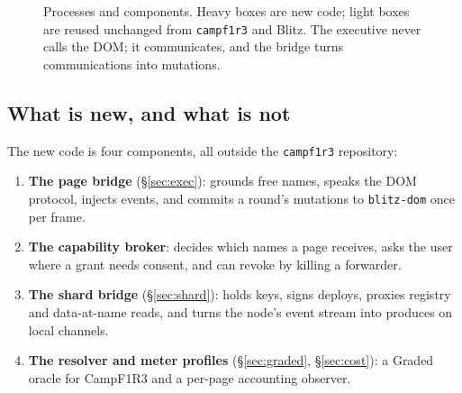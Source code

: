 \documentclass[11pt]{article}
\theoremstyle{definition}
\theoremstyle{remark}
\newcommand{\Camp}{CampF1R3}
\newcommand{\code}[1]{\texttt{#1}}
\begin{document}
\begin{figure}[!htb]
{}
\caption{Processes and components. Heavy boxes are new code; light boxes are reused
unchanged from \code{campf1r3} and Blitz. The executive never calls the DOM; it
communicates, and the bridge turns communications into mutations.}
\label{fig:arch}
\end{figure}

\subsection{What is new, and what is not}

The new code is four components, all outside the \code{campf1r3} repository:

\begin{enumerate}[nosep]
\item \textbf{The page bridge} (\S\ref{sec:exec}): grounds free names, speaks the
  DOM protocol, injects events, and commits a round's mutations to \code{blitz-dom}
  once per frame.
\item \textbf{The capability broker}: decides which names a page receives, asks the
  user where a grant needs consent, and can revoke by killing a forwarder.
\item \textbf{The shard bridge} (\S\ref{sec:shard}): holds keys, signs deploys,
  proxies registry and data-at-name reads, and turns the node's event stream into
  produces on local channels.
\item \textbf{The resolver and meter profiles} (\S\ref{sec:graded},
  \S\ref{sec:cost}): a Graded oracle for \Camp{} and a per-page accounting observer.
\end{enumerate}
\end{document}
